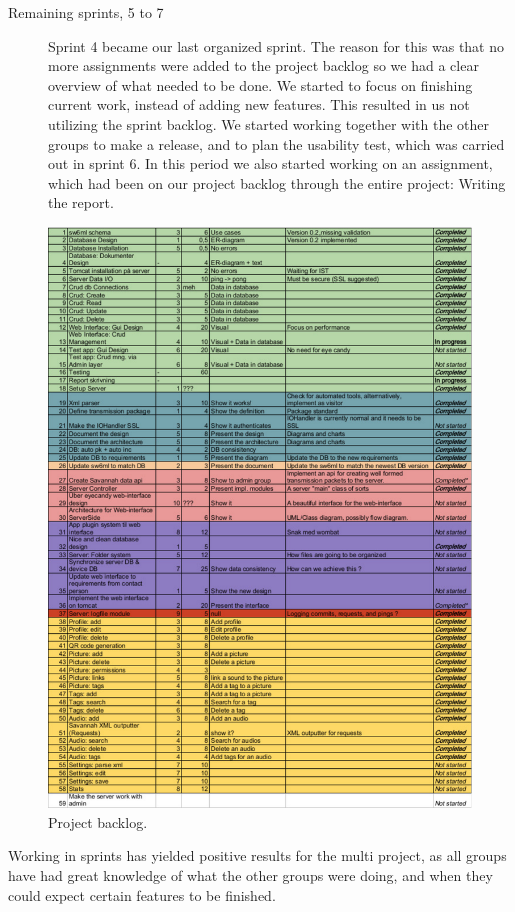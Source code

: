 \begin{description}
\item[Remaining sprints, 5 to 7]
	Sprint 4 became our last organized sprint. The reason for this was that no more assignments were added to the project backlog so we had a clear overview of what needed to be done. We started to focus on finishing current work, instead of adding new features. This resulted in us not utilizing the sprint backlog. We started working together with the other groups to make a release, and to plan the usability test, which was carried out in sprint 6. In this period we also started working on an assignment, which had been on our project backlog through the entire project: Writing the report.  
\end{description}

\begin{figure}
 \includegraphics[scale=0.72]{images/projectBacklog}
 \caption{Project backlog.}
 \label{fig:projectBacklog}
\end{figure}

Working in sprints has yielded positive results for the multi project, as all groups have had great knowledge of what the other groups were doing, and when they could expect certain features to be finished. 